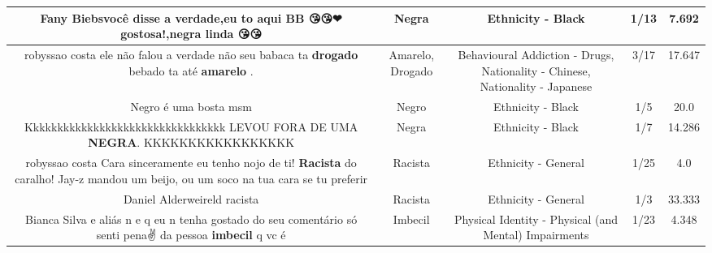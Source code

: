 \documentclass[11pt]{article}
\newlength\mylength
\begin{document}
\begin{center}
\begin{longtable}{|C{.65\mylength}|C{.30\mylength}|C{.12\mylength}|C{.12\mylength}|C{.12\mylength}|}
  \small Fany Biebsvocê disse a verdade,eu to aqui BB 😘😘❤ gostosa!,\textbf{negra} linda 😘😘\normalsize   & Negra & Ethnicity - Black & 1/13 & 7.692 \\  \hline
  \small robyssao costa  ele não falou a verdade não seu babaca   ta \textbf{drogado} bebado ta até \textbf{a\textbf{marelo}}  .\normalsize   & Amarelo, Drogado & Behavioural Addiction - Drugs, Nationality - Chinese, Nationality - Japanese & 3/17 & 17.647 \\  \hline
  \small Negro é uma bosta msm\normalsize   & Negro & Ethnicity - Black & 1/5 & 20.0 \\  \hline
  \small Kkkkkkkkkkkkkkkkkkkkkkkkkkkkkkkkk LEVOU FORA DE UMA \textbf{NEGRA}. KKKKKKKKKKKKKKKKK\normalsize   & Negra & Ethnicity - Black & 1/7 & 14.286 \\  \hline
  \small robyssao costa Cara sinceramente eu tenho nojo de ti! \textbf{Racista} do caralho! Jay-z mandou um beijo, ou um soco na tua cara se tu preferir\normalsize   & Racista & Ethnicity - General & 1/25 & 4.0 \\  \hline
  \small Daniel Alderweireld racista\normalsize   & Racista & Ethnicity - General & 1/3 & 33.333 \\  \hline
  \small Bianca Silva e aliás n e q eu n tenha gostado do seu comentário só senti pena✌  da pessoa \textbf{imbecil} q vc é\normalsize   & Imbecil & Physical Identity - Physical (and Mental) Impairments & 1/23 & 4.348 \\  \hline

\end{longtable}
\end{center}
\end{document}
